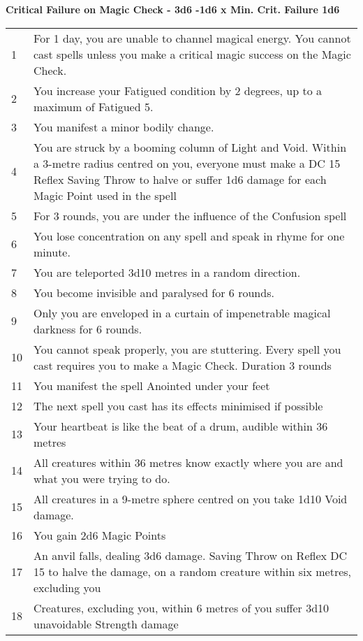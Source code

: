 \documentclass[landscape,10pt,a4paper]{article}
\begin{document}
\begin{multicols}{2}
\begin{dmbox}[title=Critical Failure on Magic Check - page \pageref{magiccriticalfailureonmagiccheck}]

\textbf{Critical Failure on Magic Check - 3d6 -1d6 x Min. Crit. Failure 1d6}
\begin{tabularx}{1\linewidth}{lX}
1 & For 1 day, you are unable to channel magical energy. You cannot cast spells unless you make a critical magic success on the Magic Check.\\
2 & You increase your Fatigued condition by 2 degrees, up to a maximum of Fatigued 5.\\
3 & You manifest a minor bodily change.\\
4 & You are struck by a booming column of Light and Void. Within a 3-metre radius centred on you, everyone must make a DC 15 Reflex Saving Throw to halve or suffer 1d6 damage for each Magic Point used in the spell\\
5 & For 3 rounds, you are under the influence of the Confusion spell\\
6 & You lose concentration on any spell and speak in rhyme for one minute.\\
7 & You are teleported 3d10 metres in a random direction.\\
8 & You become invisible and paralysed for 6 rounds.\\
9 & Only you are enveloped in a curtain of impenetrable magical darkness for 6 rounds.\\
10 & You cannot speak properly, you are stuttering. Every spell you cast requires you to make a Magic Check. Duration 3 rounds\\
11 & You manifest the spell Anointed under your feet\\
12 & The next spell you cast has its effects minimised if possible\\
13 & Your heartbeat is like the beat of a drum, audible within 36 metres\\
14 & All creatures within 36 metres know exactly where you are and what you were trying to do.\\
15 & All creatures in a 9-metre sphere centred on you take 1d10 Void damage.\\
16 & You gain 2d6 Magic Points\\
17 & An anvil falls, dealing 3d6 damage. Saving Throw on Reflex DC 15 to halve the damage, on a random creature within six metres, excluding you\\
18 & Creatures, excluding you, within 6 metres of you suffer 3d10 unavoidable Strength damage
\end{tabularx}
\end{dmbox}



\end{multicols}
\end{document}
